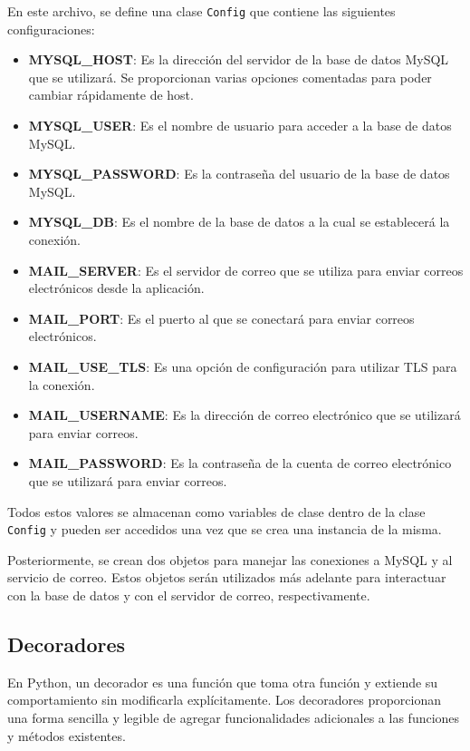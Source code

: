 \documentclass[a4paper, 12pt]{book}
\begin{document}
En este archivo, se define una clase \texttt{Config} que contiene las siguientes configuraciones:

\begin{itemize}
    \item \textbf{MYSQL\_HOST}: Es la dirección del servidor de la base de datos MySQL que se utilizará. Se proporcionan varias opciones comentadas para poder cambiar rápidamente de host.
    \item \textbf{MYSQL\_USER}: Es el nombre de usuario para acceder a la base de datos MySQL.
    \item \textbf{MYSQL\_PASSWORD}: Es la contraseña del usuario de la base de datos MySQL.
    \item \textbf{MYSQL\_DB}: Es el nombre de la base de datos a la cual se establecerá la conexión.
    \item \textbf{MAIL\_SERVER}: Es el servidor de correo que se utiliza para enviar correos electrónicos desde la aplicación.
    \item \textbf{MAIL\_PORT}: Es el puerto al que se conectará para enviar correos electrónicos.
    \item \textbf{MAIL\_USE\_TLS}: Es una opción de configuración para utilizar TLS para la conexión.
    \item \textbf{MAIL\_USERNAME}: Es la dirección de correo electrónico que se utilizará para enviar correos.
    \item \textbf{MAIL\_PASSWORD}: Es la contraseña de la cuenta de correo electrónico que se utilizará para enviar correos.
\end{itemize}

Todos estos valores se almacenan como variables de clase dentro de la clase \texttt{Config} y pueden ser accedidos una vez que se crea una instancia de la misma.

Posteriormente, se crean dos objetos para manejar las conexiones a MySQL y al servicio de correo. Estos objetos serán utilizados más adelante para interactuar con 
la base de datos y con el servidor de correo, respectivamente.

\subsection{Decoradores}
\label{subsec:decoradores}

En Python, un decorador es una función que toma otra función y extiende su comportamiento sin modificarla explícitamente. Los decoradores proporcionan una forma 
sencilla y legible de agregar funcionalidades adicionales a las funciones y métodos existentes.
\end{document}
